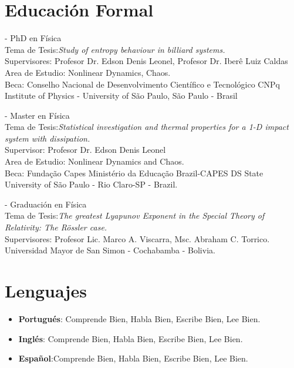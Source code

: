 \documentclass[margin,line]{resume}
\begin{document}
\begin{resume}
    \section{\mysidestyle Educación Formal}

 -  PhD en F\'isica \\
           Tema de Tesis:{\it Study of entropy behaviour in billiard systems.}\\
           Supervisores: { Profesor Dr. Edson Denis Leonel, Profesor Dr. Iber\^e Luiz Caldas}\\
           Area de Estudio: Nonlinear Dynamics, Chaos.\\
           Beca: Conselho Nacional de Desenvolvimento Cient\'ifico e Tecnol\'ogico CNPq
           Institute of Physics - University of S\~ao Paulo, S\~ao Paulo - Brasil


 - Master en F\'isica \\
           Tema de Tesis:{\it Statistical investigation and thermal properties for a 1-D impact system with dissipation.}\\
           Supervisor: { Profesor Dr. Edson Denis Leonel}\\
           Area de Estudio: Nonlinear Dynamics and Chaos.\\
           Beca: Funda\c c\~ao Capes Minist\'erio da Educa\c c\~ao Brazil-CAPES DS
           State University of S\~ao Paulo - Rio Claro-SP - Brazil.

 - Graduaci\'on en F\'isica\\
         Tema de Tesis:{\it The greatest Lyapunov Exponent in the Special Theory of Relativity: The R\"ossler case.}\\   
         Supervisores: Profesor Lic. Marco A. Viscarra, Msc. Abraham C. Torrico.\\
         Universidad Mayor de San Simon - Cochabamba - Bolivia.
    
\section{\mysidestyle Lenguajes}
\begin{itemize}
     \item {\bf Portugu\'es}: Comprende Bien, Habla Bien, Escribe Bien, Lee Bien.
     \item {\bf Ingl\'es}: Comprende Bien, Habla Bien, Escribe Bien, Lee Bien.
     \item {\bf Español}:Comprende Bien, Habla Bien, Escribe Bien, Lee Bien.
\end{itemize}


\end{resume}
\end{document}
